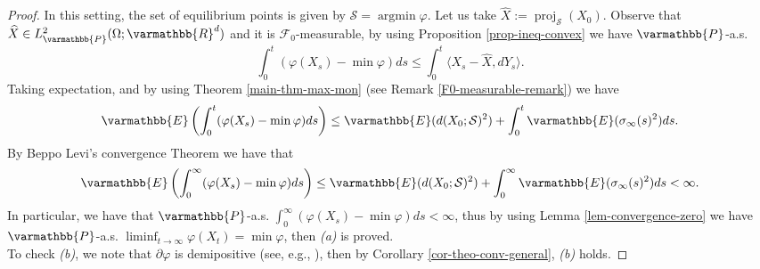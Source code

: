 \documentclass[11pt,reqno]{article}
\let\mathbb=\varmathbb
\newcommand{\R}{\mathbb{R}}
\newcommand{\1}{\mathds{1}}
\DeclareMathOperator{\proj}{proj}
\numberwithin{equation}{section}  %
\theoremstyle{plain}
\theoremstyle{definition}
\theoremstyle{remark}
\numberwithin{theorem}{section}
\numberwithin{remark}{section}
\numberwithin{example}{section}
\begin{document}
    \begin{proof}
    In this setting, the set of equilibrium points is given by $\mathcal{S} = \operatorname{argmin} \varphi$. Let us take $\widehat{X} := \proj_{\mathcal{S}}(X_0)$. Observe that $\widehat{X}\in L^2_{\mathbb{P}}(\Omega;\R^d)$ and it is $\mathcal{F}_0$-measurable, by using Proposition \ref{prop-ineq-convex} we have $\mathbb{P}$-a.s.
	\begin{equation*}\label{convexity-Xs}
		\int_0^t(\varphi(X_s)-\min\varphi )ds\leq \int_0^t\langle X_s-\widehat{X},dY_s\rangle.
	\end{equation*}
	Taking expectation, and by using Theorem \ref{main-thm-max-mon} (see Remark \ref{F0-measurable-remark}) we have
	\begin{equation}\label{eqn-varphi-exp1}
		\begin{aligned}
			\mathbb{E}\left(\int_0^t(\varphi(X_s)-\min\varphi )ds\right)\leq \mathbb{E}(d(X_0;\mathcal{S})^2)+\int_0^t\mathbb{E}(\sigma_\infty(s)^2) ds.
		\end{aligned}
	\end{equation}
	By Beppo Levi's convergence Theorem we have that
	\begin{equation*}
		\mathbb{E}\left( \int_0^\infty(\varphi(X_s)-\min\varphi )ds \right) \leq \mathbb{E}(d(X_0;\mathcal{S})^2)+\int_0^\infty\mathbb{E}(\sigma_\infty(s)^2) ds<\infty.
	\end{equation*}
	In particular, we have that $\mathbb{P}$-a.s. $\int_0^\infty(\varphi(X_s)-\min\varphi )ds<\infty$, thus by using Lemma \ref{lem-convergence-zero} we have $\mathbb{P}$-a.s. $\displaystyle\liminf_{t\to \infty}\varphi(X_t)=\min\varphi$, then \emph{(a)} is proved.\\
    To check \emph{(b)}, we note that $\partial \varphi$ is demipositive (see, e.g., \cite[Proposition 6.2]{MR2731260}), then by Corollary \ref{cor-theo-conv-general}, \emph{(b)} holds.
    

\end{proof}
\end{document}
